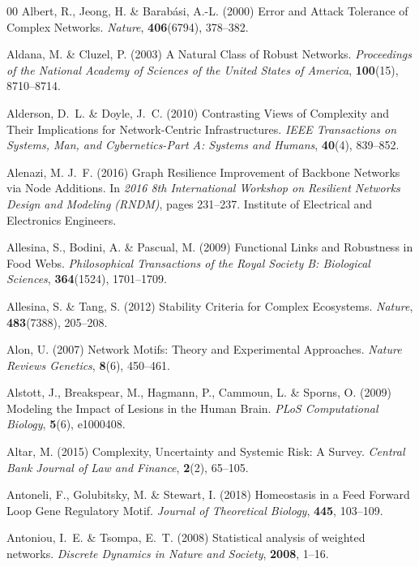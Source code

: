 \documentclass{comnet-mod}
\begin{document}
\begin{thebibliography}{00}
Albert, R., Jeong, H. {\&} Barab{\'a}si, A.-L. (2000)  {Error and Attack
  Tolerance of Complex Networks}. {\em {Nature}}, \textbf{406}(6794), 378--382.

Aldana, M. {\&} Cluzel, P. (2003)  {A Natural Class of Robust Networks}. {\em
  {Proceedings of the National Academy of Sciences of the United States of
  America}}, \textbf{100}(15), 8710--8714.

Alderson, D.~L. {\&} Doyle, J.~C. (2010)  {Contrasting Views of Complexity and
  Their Implications for Network-Centric Infrastructures}. {\em {IEEE
  Transactions on Systems, Man, and Cybernetics-Part A: Systems and Humans}},
  \textbf{40}(4), 839--852.

Alenazi, M. J.~F. (2016)  {Graph Resilience Improvement of Backbone Networks
  via Node Additions}. In {\em {2016 8th International Workshop on Resilient
  Networks Design and Modeling ({{RNDM}})}}, pages 231--237. {Institute of
  Electrical and Electronics Engineers}.

Allesina, S., Bodini, A. {\&} Pascual, M. (2009)  {Functional Links and
  Robustness in Food Webs}. {\em {Philosophical Transactions of the Royal
  Society B: Biological Sciences}}, \textbf{364}(1524), 1701--1709.

Allesina, S. {\&} Tang, S. (2012)  {Stability Criteria for Complex Ecosystems}.
  {\em {Nature}}, \textbf{483}(7388), 205--208.

Alon, U. (2007)  {Network Motifs: {{Theory}} and Experimental Approaches}. {\em
  {Nature Reviews Genetics}}, \textbf{8}(6), 450--461.

Alstott, J., Breakspear, M., Hagmann, P., Cammoun, L. {\&} Sporns, O. (2009)
  {Modeling the Impact of Lesions in the Human Brain}. {\em {PLoS Computational
  Biology}}, \textbf{5}(6), e1000408.

Altar, M. (2015)  {Complexity, Uncertainty and Systemic Risk: {{A}} Survey}.
  {\em {Central Bank Journal of Law and Finance}}, \textbf{2}(2), 65--105.

Antoneli, F., Golubitsky, M. {\&} Stewart, I. (2018)  {Homeostasis in a Feed
  Forward Loop Gene Regulatory Motif}. {\em {Journal of Theoretical Biology}},
  \textbf{445}, 103--109.

Antoniou, I.~E. {\&} Tsompa, E.~T. (2008)  Statistical analysis of weighted
  networks. {\em {Discrete Dynamics in Nature and Society}}, \textbf{2008},
  1--16.


\end{thebibliography}
\end{document}
